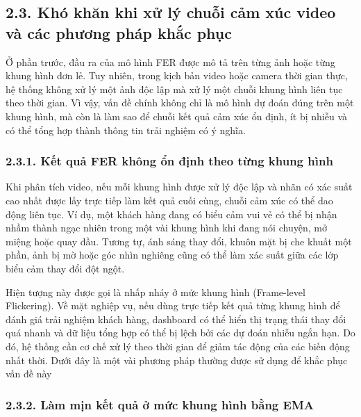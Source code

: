 \subsection*{2.3. Khó khăn khi xử lý chuỗi cảm xúc video và các phương pháp khắc phục}

Ở phần trước, đầu ra của mô hình FER được mô tả trên từng ảnh hoặc từng khung hình đơn lẻ. Tuy nhiên, trong kịch bản video hoặc camera thời gian thực, hệ thống không xử lý một ảnh độc lập mà xử lý một chuỗi khung hình liên tục theo thời gian. Vì vậy, vấn đề chính không chỉ là mô hình dự đoán đúng trên một khung hình, mà còn là làm sao để chuỗi kết quả cảm xúc ổn định, ít bị nhiễu và có thể tổng hợp thành thông tin trải nghiệm có ý nghĩa.

\subsubsection*{2.3.1. Kết quả FER không ổn định theo từng khung hình}

Khi phân tích video, nếu mỗi khung hình được xử lý độc lập và nhãn có xác suất cao nhất được lấy trực tiếp làm kết quả cuối cùng, chuỗi cảm xúc có thể dao động liên tục. Ví dụ, một khách hàng đang có biểu cảm vui vẻ có thể bị nhận nhầm thành ngạc nhiên trong một vài khung hình khi đang nói chuyện, mở miệng hoặc quay đầu. Tương tự, ánh sáng thay đổi, khuôn mặt bị che khuất một phần, ảnh bị mờ hoặc góc nhìn nghiêng cũng có thể làm xác suất giữa các lớp biểu cảm thay đổi đột ngột.

Hiện tượng này được gọi là nhấp nháy ở mức khung hình (Frame-level Flickering). Về mặt nghiệp vụ, nếu dùng trực tiếp kết quả từng khung hình để đánh giá trải nghiệm khách hàng, dashboard có thể hiển thị trạng thái thay đổi quá nhanh và dữ liệu tổng hợp có thể bị lệch bởi các dự đoán nhiễu ngắn hạn. Do đó, hệ thống cần cơ chế xử lý theo thời gian để giảm tác động của các biến động nhất thời. Dưới đây là một vài phương pháp thường được sử dụng để khắc phục vấn đề này

\subsubsection*{2.3.2. Làm mịn kết quả ở mức khung hình bằng EMA}

